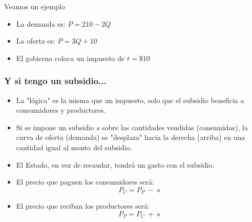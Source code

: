 \documentclass{beamer}
\begin{document}
\begin{frame}
\begin{columns}
\begin{column}{0.49\textwidth}

\end{column}
\end{columns}
\end{frame}

\begin{frame}{Veamos un ejemplo}
\begin{itemize}
    \item La demanda es: $P=210-2Q$
    \item La oferta es: $P=3Q+10$
    \item El gobierno coloca un impuesto de $t=\$10$
\end{itemize}
\end{frame}

\begin{frame}
\frametitle{Y si tengo un subsidio...}

\begin{itemize}
    \item La "lógica" es la misma que un impuesto, solo que el subsidio beneficia a consumidores y productores. \vspace{1mm}
    \item Si se impone un subsidio $s$ sobre las cantidades vendidas (consumidas), la curva de oferta (demanda) se "desplaza" hacia la derecha (arriba) en una cantidad igual al monto del subsidio.
    \vspace{1mm}
    \item El Estado, en vez de recaudar, tendrá un gasto con el subsidio.
    \vspace{1mm}
    \item El precio que paguen los consumidores será:
          \[ P_C=P_P\ - \ s\] 
    \item El precio que reciban los productores será:
          \[ P_P=P_C\ + \ s\]       

\end{itemize}
\end{frame}
\end{document}

